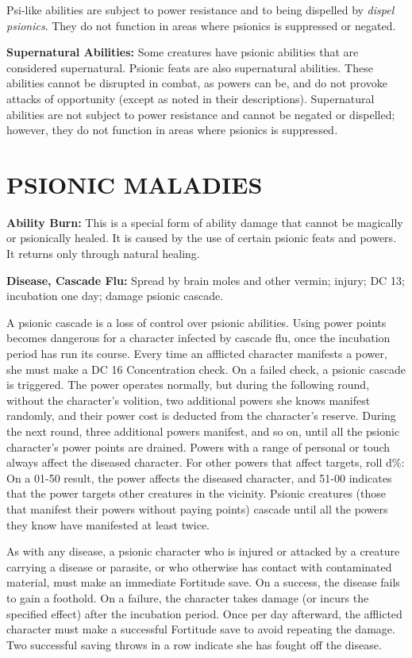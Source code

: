 \documentclass{article}
\begin{document}
Psi-like abilities are subject to power resistance and to being dispelled by \textit{dispel 
psionics}. They do not function in areas where psionics is suppressed or negated.

\textbf{Supernatural Abilities:} Some creatures have psionic abilities that are 
considered supernatural. Psionic feats are also supernatural abilities. These abilities 
cannot be disrupted in combat, as powers can be, and do not provoke attacks of 
opportunity (except as noted in their descriptions). Supernatural abilities are 
not subject to power resistance and cannot be negated or dispelled; however, they 
do not function in areas where psionics is suppressed\textit{.}

\vspace{12pt}
\section*{{\LARGE{}PSIONIC MALADIES}}

\textbf{Ability Burn:} This is a special form of ability damage that cannot be 
magically or psionically healed. It is caused by the use of certain psionic feats 
and powers. It returns only through natural healing.

\textbf{Disease, Cascade Flu:} Spread by brain moles and other vermin; injury; 
DC 13; incubation one day; damage psionic cascade.

A psionic cascade is a loss of control over psionic abilities. Using power points 
becomes dangerous for a character infected by cascade flu, once the incubation 
period has run its course. Every time an afflicted character manifests a power, 
she must make a DC 16 Concentration check. On a failed check, a psionic cascade 
is triggered. The power operates normally, but during the following round, without 
the character's volition, two additional powers she knows manifest randomly, and 
their power cost is deducted from the character's reserve. During the next round, 
three additional powers manifest, and so on, until all the psionic character's 
power points are drained. Powers with a range of personal or touch always affect 
the diseased character. For other powers that affect targets, roll d\%: On a 01-50 
result, the power affects the diseased character, and 51-00 indicates that the 
power targets other creatures in the vicinity. Psionic creatures (those that manifest 
their powers without paying points) cascade until all the powers they know have 
manifested at least twice.

As with any disease, a psionic character who is injured or attacked by a creature 
carrying a disease or parasite, or who otherwise has contact with contaminated 
material, must make an immediate Fortitude save. On a success, the disease fails 
to gain a foothold. On a failure, the character takes damage (or incurs the specified 
effect) after the incubation period. Once per day afterward, the afflicted character 
must make a successful Fortitude save to avoid repeating the damage. Two successful 
saving throws in a row indicate she has fought off the disease.
\end{document}
